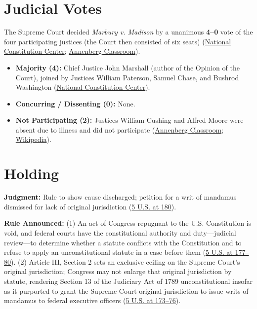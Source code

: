 \documentclass[12pt]{article}
\begin{document}
\section{Judicial Votes}

The Supreme Court decided \textit{Marbury v. Madison} by a unanimous \textbf{4--0} vote of the four participating justices (the Court then consisted of six seats) (\href{https://constitutioncenter.org/the-constitution/supreme-court-case-library/marbury-v-madison}{National Constitution Center}; \href{https://www.annenbergclassroom.org/resource/the-pursuit-of-justice/pursuit-justice-chapter-1-rise-judicial-review/}{Annenberg Classroom}).

\begin{itemize}
\item \textbf{Majority (4):} Chief Justice John Marshall (author of the Opinion of the Court), joined by Justices William Paterson, Samuel Chase, and Bushrod Washington (\href{https://constitutioncenter.org/the-constitution/supreme-court-case-library/marbury-v-madison}{National Constitution Center}).
\item \textbf{Concurring / Dissenting (0):} None.
\item \textbf{Not Participating (2):} Justices William Cushing and Alfred Moore were absent due to illness and did not participate (\href{https://www.annenbergclassroom.org/resource/the-pursuit-of-justice/pursuit-justice-chapter-1-rise-judicial-review/}{Annenberg Classroom}; \href{https://en.wikipedia.org/wiki/Marbury_v._Madison}{Wikipedia}).
\end{itemize}

\section{Holding}

\textbf{Judgment:} Rule to show cause discharged; petition for a writ of mandamus dismissed for lack of original jurisdiction (\href{https://supreme.justia.com/cases/federal/us/5/137/}{5 U.S. at 180}).

\textbf{Rule Announced:} (1) An act of Congress repugnant to the U.S. Constitution is void, and federal courts have the constitutional authority and duty---judicial review---to determine whether a statute conflicts with the Constitution and to refuse to apply an unconstitutional statute in a case before them (\href{https://supreme.justia.com/cases/federal/us/5/137/}{5 U.S. at 177--80}). (2) Article III, Section 2 sets an exclusive ceiling on the Supreme Court's original jurisdiction; Congress may not enlarge that original jurisdiction by statute, rendering Section 13 of the Judiciary Act of 1789 unconstitutional insofar as it purported to grant the Supreme Court original jurisdiction to issue writs of mandamus to federal executive officers (\href{https://supreme.justia.com/cases/federal/us/5/137/}{5 U.S. at 173--76}).
\end{document}
